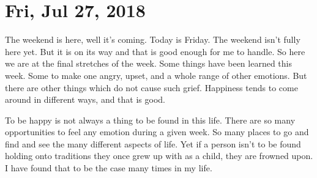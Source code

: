 \section{Fri, Jul 27, 2018}

The weekend is here, well it's coming. Today is Friday. The weekend isn't fully here
yet. But it is on its way and that is good enough for me to handle. So here we are at
the final stretches of the week. Some things have been learned this week. Some to
make one angry, upset, and a whole range of other emotions. But there are other
things which do not cause such grief. Happiness tends to come around in different
ways, and that is good.

To be happy is not always a thing to be found in this life. There are so many
opportunities to feel any emotion during a given week. So many places to go and find
and see the many different aspects of life. Yet if a person isn't to be found holding
onto traditions they once grew up with as a child, they are frowned upon. I have
found that to be the case many times in my life.
